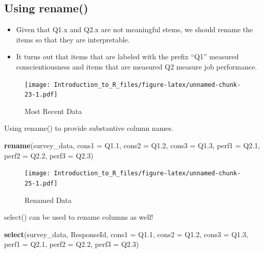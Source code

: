 \documentclass[]{book}
\newenvironment{Shaded}{\begin{snugshade}}{\end{snugshade}}
\newcommand{\DataTypeTok}[1]{\textcolor[rgb]{0.13,0.29,0.53}{#1}}
\newcommand{\FloatTok}[1]{\textcolor[rgb]{0.00,0.00,0.81}{#1}}
\newcommand{\KeywordTok}[1]{\textcolor[rgb]{0.13,0.29,0.53}{\textbf{#1}}}
\newcommand{\NormalTok}[1]{#1}
\providecommand{\tightlist}{%
  \setlength{\itemsep}{0pt}\setlength{\parskip}{0pt}}
\theoremstyle{definition}
\theoremstyle{definition}
\theoremstyle{definition}
\theoremstyle{remark}
\let\BeginKnitrBlock\begin \let\EndKnitrBlock\end
\begin{document}
\hypertarget{using-rename}{%
\subsection{Using rename()}\label{using-rename}}

\begin{itemize}
\tightlist
\item
  Given that Q1.x and Q2.x are not meaningful stems, we should rename the items so that they are interpretable.
\item
  It turns out that items that are labeled with the prefix ``Q1'' measured conscientiousness and items that are measured Q2 measure job performance.
\end{itemize}

\begin{figure}
\centering
\texttt{[image: Introduction\_to\_R\_files/figure-latex/unnamed-chunk-23-1.pdf]}
\caption{\label{fig:unnamed-chunk-23}Most Recent Data}
\end{figure}

\BeginKnitrBlock{example}
\protect\hypertarget{exm:rename1}{}{\label{exm:rename1} }Using rename() to provide substantive column names.
\EndKnitrBlock{example}

\begin{Shaded}
\begin{Highlighting}[]
\KeywordTok{rename}\NormalTok{(survey_data, }\DataTypeTok{cons1 =}\NormalTok{ Q1}\FloatTok{.1}\NormalTok{, }\DataTypeTok{cons2 =}\NormalTok{ Q1}\FloatTok{.2}\NormalTok{,}
       \DataTypeTok{cons3 =}\NormalTok{ Q1}\FloatTok{.3}\NormalTok{, }\DataTypeTok{perf1 =}\NormalTok{ Q2}\FloatTok{.1}\NormalTok{, }\DataTypeTok{perf2 =}\NormalTok{ Q2}\FloatTok{.2}\NormalTok{, }
       \DataTypeTok{perf3 =}\NormalTok{ Q2}\FloatTok{.3}\NormalTok{)}
\end{Highlighting}
\end{Shaded}

\begin{figure}
\centering
\texttt{[image: Introduction\_to\_R\_files/figure-latex/unnamed-chunk-25-1.pdf]}
\caption{\label{fig:unnamed-chunk-25}Renamed Data}
\end{figure}

\BeginKnitrBlock{example}
\protect\hypertarget{exm:rename2}{}{\label{exm:rename2} }select() can be used to rename columns as well!
\EndKnitrBlock{example}

\begin{Shaded}
\begin{Highlighting}[]
\KeywordTok{select}\NormalTok{(survey_data, ResponseId, }\DataTypeTok{cons1 =}\NormalTok{ Q1}\FloatTok{.1}\NormalTok{, }
       \DataTypeTok{cons2 =}\NormalTok{ Q1}\FloatTok{.2}\NormalTok{, }\DataTypeTok{cons3 =}\NormalTok{ Q1}\FloatTok{.3}\NormalTok{, }\DataTypeTok{perf1 =}\NormalTok{ Q2}\FloatTok{.1}\NormalTok{, }
       \DataTypeTok{perf2 =}\NormalTok{ Q2}\FloatTok{.2}\NormalTok{, }\DataTypeTok{perf3 =}\NormalTok{ Q2}\FloatTok{.3}\NormalTok{)}
\end{Highlighting}
\end{Shaded}
\end{document}
